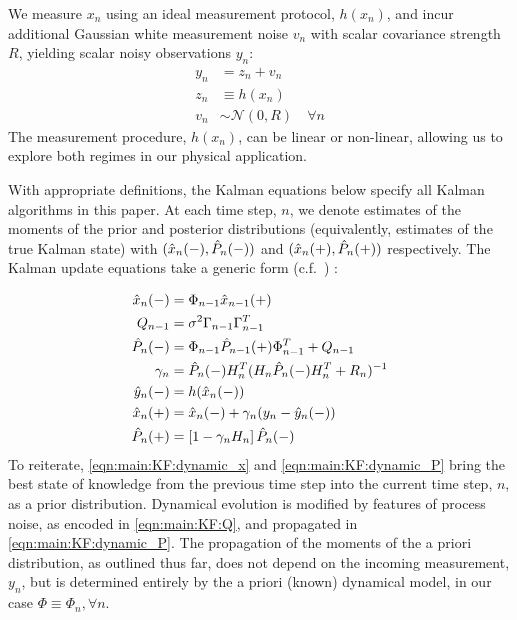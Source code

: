We measure $x_n$ using an ideal measurement protocol, $h(x_n)$, and incur additional Gaussian white measurement noise $v_n$ with scalar covariance strength $R$, yielding scalar noisy observations $y_n$:
\begin{align}
y_n &= z_n + v_n \\
z_n & \equiv  h(x_n) \\
v_n & \sim \mathcal{N}(0, R) \quad \forall n
\end{align}
The measurement procedure, $h(x_n)$, can be linear or non-linear, allowing us to explore both regimes in our physical application.

With appropriate definitions, the Kalman equations below specify all Kalman algorithms in this paper. At each time step, $n$, we denote estimates of the moments of the prior and posterior distributions (equivalently, estimates of the true Kalman state) with $(\hat{x}_{n}(-), \hat{P}_{n}(-))$ and $(\hat{x}_{n}(+), \hat{P}_{n}(+))$ respectively. The Kalman update equations take a generic form (c.f.~\cite{grewal2001theory}) :

\begin{align}
\hat{x}_{n}(-) & = \Phi_{n-1} \hat{x}_{n-1}(+) \label{eqn:main:KF:dynamic_x}\\ 
Q_{n-1} & = \sigma^2 \Gamma_{n-1}\Gamma_{n-1}^T  \label{eqn:main:KF:Q}\\
\hat{P}_{n}(-)&= \Phi_{n-1} \hat{P}_{n-1}(+) \Phi_{n-1}^T + Q_{n-1} \label{eqn:main:KF:dynamic_P}\\
\gamma_n &= \hat{P}_{n}(-) H_n^T(H_n\hat{P}_{n}(-)H_n^T + R_n)^{-1} \label{eqn:main:KF:gain}\\
\hat{y}_n(-) & = h(\hat{x}_{n}(-)) \label{eqn:main:KF:step_ahead}\\
\hat{x}_{n}(+) &= \hat{x}_{n}(-) + \gamma_n (y_n - \hat{y}_n(-)) \label{eqn:main:KF:bayesian_x}\\
\hat{P}_{n}(+) &= \left[1  - \gamma_n H_n \right] \hat{P}_{n}(-) \label{eqn:main:KF:bayesian_p}
\end{align}
To reiterate, \cref{eqn:main:KF:dynamic_x} and \cref{eqn:main:KF:dynamic_P} bring the best state of knowledge from the previous time step into the current time step, $n$, as a prior distribution. Dynamical evolution is modified by features of process noise, as encoded in \cref{eqn:main:KF:Q}, and propagated in \cref{eqn:main:KF:dynamic_P}. The propagation of the moments of the a priori distribution, as outlined thus far, does not depend on the incoming measurement, $y_n$, but is determined entirely by the a priori (known) dynamical model, in our case $\Phi \equiv \Phi_n, \forall n$. 

